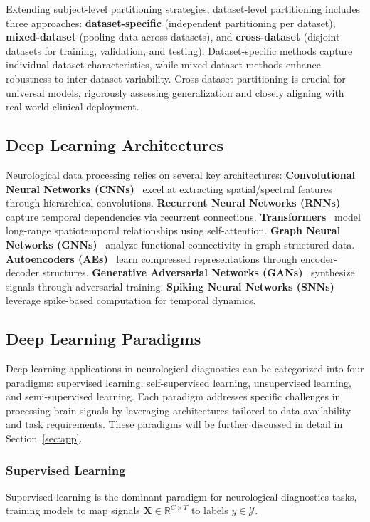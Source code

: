 Extending subject-level partitioning strategies, dataset-level partitioning includes three approaches: \textbf{dataset-specific} (independent partitioning per dataset), \textbf{mixed-dataset} (pooling data across datasets), and \textbf{cross-dataset} (disjoint datasets for training, validation, and testing). Dataset-specific methods capture individual dataset characteristics, while mixed-dataset methods enhance robustness to inter-dataset variability. Cross-dataset partitioning is crucial for universal models, rigorously assessing generalization and closely aligning with real-world clinical deployment.

\subsection{Deep Learning Architectures}
Neurological data processing relies on several key architectures:
\textbf{Convolutional Neural Networks (CNNs)}~\cite{lecun1995convolutional} excel at extracting spatial/spectral features through hierarchical convolutions.
\textbf{Recurrent Neural Networks (RNNs)}~\cite{elman1990finding} capture temporal dependencies via recurrent connections.
\textbf{Transformers}~\cite{vaswani2017attention} model long-range spatiotemporal relationships using self-attention.
\textbf{Graph Neural Networks (GNNs)}~\cite{4700287} analyze functional connectivity in graph-structured data.
\textbf{Autoencoders (AEs)}~\cite{hinton1993autoencoders} learn compressed representations through encoder-decoder structures.
\textbf{Generative Adversarial Networks (GANs)}~\cite{goodfellow2014generative} synthesize signals through adversarial training.
\textbf{Spiking Neural Networks (SNNs)}~\cite{maass1997networks} leverage spike-based computation for temporal dynamics.


\subsection{Deep Learning Paradigms}
Deep learning applications in neurological diagnostics can be categorized into four paradigms: supervised learning, self-supervised learning, unsupervised learning, and semi-supervised learning.
Each paradigm addresses specific challenges in processing brain signals by leveraging architectures tailored to data availability and task requirements.
These paradigms will be further discussed in detail in Section~\ref{sec:app}.

\subsubsection{Supervised Learning}
Supervised learning is the dominant paradigm for neurological diagnostics tasks, training models to map signals $ \mathbf{X} \in \mathbb{R}^{C \times T} $ to labels $y \in \mathcal{Y} $.

